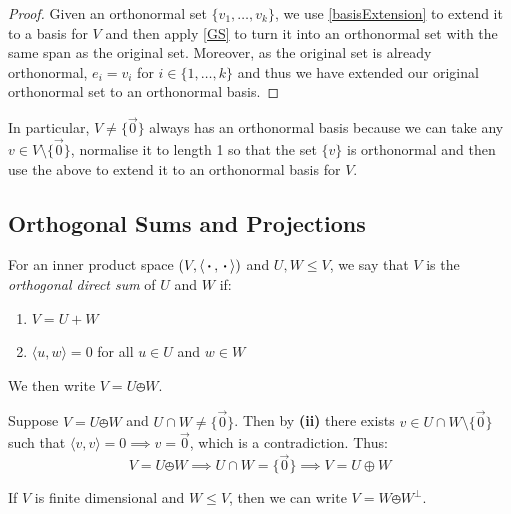 \documentclass[../main.tex]{subfiles}
\begin{document}
\begin{proof}
  Given an orthonormal set $\{v_1, \ldots, v_k\}$, we use \cref{basisExtension} to extend it to a basis for $V$ and then apply \cref{GS} to turn it into an orthonormal set with the same span as the original set.
  Moreover, as the original set is already orthonormal, $e_i = v_i$ for $i \in \{1, \ldots, k\}$ and thus we have extended our original orthonormal set to an orthonormal basis.
\end{proof}
\begin{remark}
  In particular, $V \neq \{\vec{0}\}$ always has an orthonormal basis because we can take any $v \in V \setminus \{\vec{0}\}$, normalise it to length 1 so that the set $\{v\}$ is orthonormal and then use the above to extend it to an orthonormal basis for $V$.
\end{remark}
\subsection{Orthogonal Sums and Projections}
\begin{definition}
For an inner product space $(V, \langle {\hspace{0.18em}\boldsymbol{\cdot}\hspace{0.18em}}, {\hspace{0.18em}\boldsymbol{\cdot}\hspace{0.18em}} \rangle)$ and $U, W \leq V$, we say that $V$ is the \textit{orthogonal direct sum} of $U$ and $W$ if:
  \begin{enumerate}
    \item $V = U + W$
    \item $\langle u, w \rangle = 0$ for all $u \in U$ and $w \in W$
  \end{enumerate}
  We then write $V = U \obot W$.
\end{definition}
\begin{remark}
  Suppose $V = U \obot W$ and $U \cap W \neq \{\vec{0}\}$.
  Then by \textbf{(ii)} there exists $v \in U \cap W \setminus \{\vec{0}\}$ such that $\langle v, v \rangle = 0 \implies v = \vec{0}$, which is a contradiction.
  Thus:
  \[
    V = U \obot W \implies U \cap W = \{\vec{0}\} \implies V = U \oplus W
  \]
\end{remark}
\begin{lemma}
  If $V$ is finite dimensional and $W \leq V$, then we can write $V = W \obot W^{\perp}$.
\end{lemma}
\end{document}
